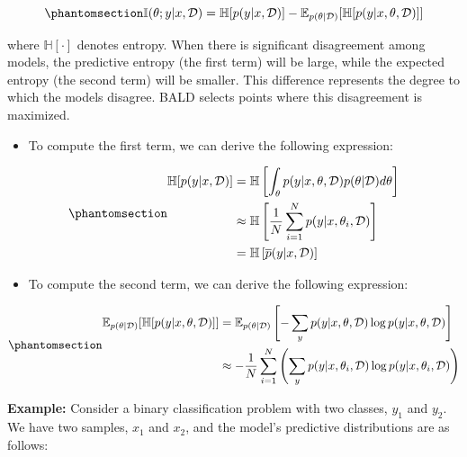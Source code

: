 \documentclass[
  letterpaper,
  numbers=noenddot,
  DIV=11]{scrreprt}
\providecommand{\tightlist}{%
  \setlength{\itemsep}{0pt}\setlength{\parskip}{0pt}}\usepackage{longtable,booktabs,array}
\theoremstyle{definition}
\theoremstyle{plain}
\theoremstyle{plain}
\theoremstyle{remark}
\begin{document}
\begin{equation}\phantomsection\label{eq-eq3.2}{
\mathbb{I}(\theta; y|x, \mathcal{D}) = \mathbb{H}[p(y|x, \mathcal{D})] - \mathbb{E}_{p(\theta | \mathcal{D})} [\mathbb{H}[p(y|x, \theta, \mathcal{D})]]
}\end{equation}

where \(\mathbb{H}[\cdot]\) denotes entropy. When there is significant
disagreement among models, the predictive entropy (the first term) will
be large, while the expected entropy (the second term) will be smaller.
This difference represents the degree to which the models disagree. BALD
selects points where this disagreement is maximized.

\begin{itemize}
\tightlist
\item
  To compute the first term, we can derive the following expression:
\end{itemize}

\begin{equation}\phantomsection\label{eq-eq3.3}{\begin{aligned}
\mathbb{H}[p(y|x, \mathcal{D})] &= \mathbb{H}\left[\int_{\theta} p(y|x, \theta, \mathcal{D}) p(\theta | \mathcal{D}) d\theta\right]\\
&\approx \mathbb{H}\left[\frac{1}{N}\sum_{i=1}^{N} p(y|x, \theta_i, \mathcal{D})\right]\\
&= \mathbb{H}\left[\overline{p}(y|x, \mathcal{D})\right]
\end{aligned}}\end{equation}

\begin{itemize}
\tightlist
\item
  To compute the second term, we can derive the following expression:
\end{itemize}

\begin{equation}\phantomsection\label{eq-eq3.4}{\begin{aligned}
\mathbb{E}_{p(\theta|\mathcal{D})} [\mathbb{H}[p(y|x, \theta, \mathcal{D})]] &= \mathbb{E}_{p(\theta|\mathcal{D})} \left[ - \sum_{y} p(y|x, \theta, \mathcal{D}) \log p(y|x, \theta, \mathcal{D}) \right] \\
&\approx - \frac{1}{N} \sum_{i=1}^{N} \left( \sum_{y} p(y|x, \theta_i, \mathcal{D}) \log p(y|x, \theta_i, \mathcal{D}) \right)
\end{aligned}}\end{equation}

\textbf{Example:} Consider a binary classification problem with two
classes, \(y_1\) and \(y_2\). We have two samples, \(x_1\) and \(x_2\),
and the model's predictive distributions are as follows:
\end{document}
